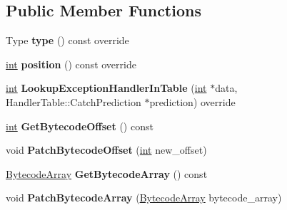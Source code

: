\subsection*{Public Member Functions}
\begin{DoxyCompactItemize}
\item 
\mbox{\label{classv8_1_1internal_1_1InterpretedFrame_a7dbb54cfdbbee5b7f93bd85dba4157c1}} 
Type {\bfseries type} () const override
\item 
\mbox{\label{classv8_1_1internal_1_1InterpretedFrame_a7a23fb2f2999e893e12e838e4a2c4739}} 
\mbox{\hyperlink{classint}{int}} {\bfseries position} () const override
\item 
\mbox{\label{classv8_1_1internal_1_1InterpretedFrame_a9b997e24419fe747402b2c3cf1b4d4be}} 
\mbox{\hyperlink{classint}{int}} {\bfseries Lookup\+Exception\+Handler\+In\+Table} (\mbox{\hyperlink{classint}{int}} $\ast$data, Handler\+Table\+::\+Catch\+Prediction $\ast$prediction) override
\item 
\mbox{\label{classv8_1_1internal_1_1InterpretedFrame_a985a37615979fc957e99100b2cb484f8}} 
\mbox{\hyperlink{classint}{int}} {\bfseries Get\+Bytecode\+Offset} () const
\item 
\mbox{\label{classv8_1_1internal_1_1InterpretedFrame_a544cdc5b93167c2a47b0acdd240eb923}} 
void {\bfseries Patch\+Bytecode\+Offset} (\mbox{\hyperlink{classint}{int}} new\+\_\+offset)
\item 
\mbox{\label{classv8_1_1internal_1_1InterpretedFrame_ad0189191dd996291250bc0985d0cac8b}} 
\mbox{\hyperlink{classv8_1_1internal_1_1BytecodeArray}{Bytecode\+Array}} {\bfseries Get\+Bytecode\+Array} () const
\item 
\mbox{\label{classv8_1_1internal_1_1InterpretedFrame_ae48aa02b9bba72bf079a0d4c1cb0295e}} 
void {\bfseries Patch\+Bytecode\+Array} (\mbox{\hyperlink{classv8_1_1internal_1_1BytecodeArray}{Bytecode\+Array}} bytecode\+\_\+array)
\item 

\end{DoxyCompactItemize}
